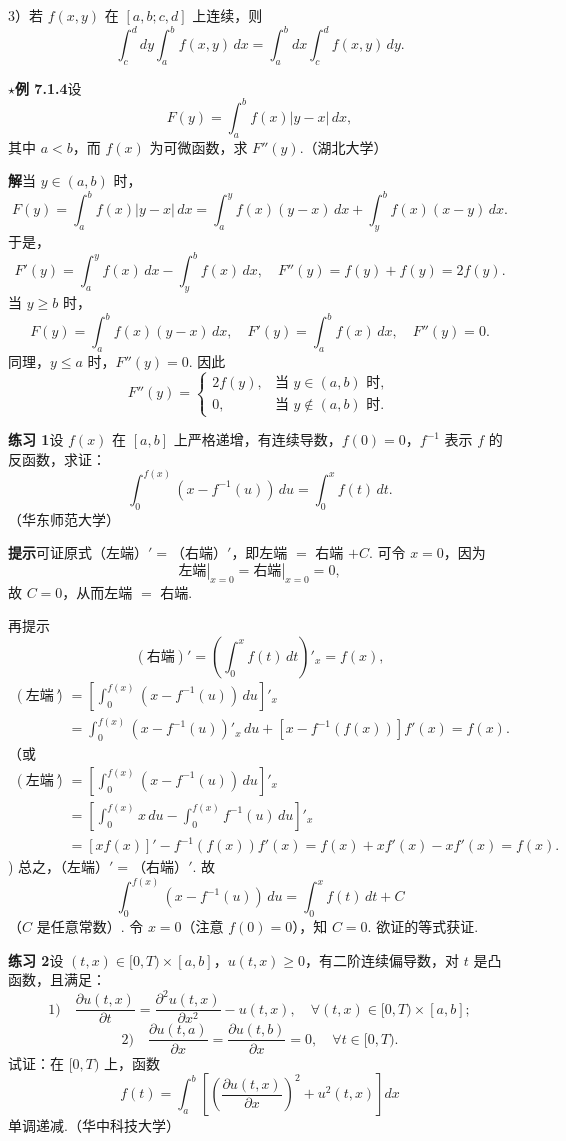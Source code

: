 \documentclass[UTF8, 12pt, fontset=fandol, oneside]{ctexart}
\begin{document}
3）若 $f(x,y)$ 在 $[a,b;c,d]$ 上连续，则
\[
\int_c^d dy\int_a^b f(x,y)\,dx
=\int_a^b dx\int_c^d f(x,y)\,dy.
\]

\noindent\textbf{$\star$例 7.1.4}\quad 设
\[
F(y)=\int_a^b f(x)|y-x|\,dx,
\]
其中 $a<b$，而 $f(x)$ 为可微函数，求 $F''(y)$.（湖北大学）

\noindent\textbf{解}\quad 当 $y\in(a,b)$ 时，
\[
F(y)=\int_a^b f(x)|y-x|\,dx
=\int_a^y f(x)(y-x)\,dx+\int_y^b f(x)(x-y)\,dx.
\]
于是，
\[
F'(y)=\int_a^y f(x)\,dx-\int_y^b f(x)\,dx,\quad
F''(y)=f(y)+f(y)=2f(y).
\]
当 $y\ge b$ 时，
\[
F(y)=\int_a^b f(x)(y-x)\,dx,\quad
F'(y)=\int_a^b f(x)\,dx,\quad F''(y)=0.
\]
同理，$y\le a$ 时，$F''(y)=0$. 因此
\[
F''(y)=
\begin{cases}
2f(y), & \text{当 }y\in(a,b)\text{ 时},\\
0, & \text{当 }y\notin(a,b)\text{ 时}.
\end{cases}
\]

\noindent\textbf{练习 1}\quad 设 $f(x)$ 在 $[a,b]$ 上严格递增，有连续导数，$f(0)=0$，$f^{-1}$ 表示 $f$ 的反函数，求证：
\[
\int_0^{f(x)}\left(x-f^{-1}(u)\right)\,du=\int_0^x f(t)\,dt.
\]
（华东师范大学）

\noindent\textbf{提示}\quad 可证原式（左端）$'=$（右端）$'$，即左端 $=$ 右端 $+C$. 可令 $x=0$，因为
\[
\left.\text{左端}\right|_{x=0}=\left.\text{右端}\right|_{x=0}=0,
\]
故 $C=0$，从而左端 $=$ 右端.

再提示
\[
\left(\text{右端}\right)'=\left(\int_0^x f(t)\,dt\right)'_x=f(x),
\]
\[
\begin{aligned}
\left(\text{左端}\right)'
&=\left[\int_0^{f(x)}\left(x-f^{-1}(u)\right)\,du\right]'_x\\
&=\int_0^{f(x)}\left(x-f^{-1}(u)\right)'_x\,du
+\left[x-f^{-1}(f(x))\right]f'(x)=f(x).
\end{aligned}
\]
（或
\[
\begin{aligned}
\left(\text{左端}\right)'
&=\left[\int_0^{f(x)}\left(x-f^{-1}(u)\right)\,du\right]'_x\\
&=\left[\int_0^{f(x)}x\,du-\int_0^{f(x)}f^{-1}(u)\,du\right]'_x\\
&=\left[xf(x)\right]'-f^{-1}(f(x))f'(x)
=f(x)+xf'(x)-xf'(x)=f(x).
\end{aligned}
\])
总之，（左端）$'=$（右端）$'$. 故
\[
\int_0^{f(x)}\left(x-f^{-1}(u)\right)\,du
=\int_0^x f(t)\,dt+C
\]
（$C$ 是任意常数）. 令 $x=0$（注意 $f(0)=0$），知 $C=0$. 欲证的等式获证.

\noindent\textbf{练习 2}\quad 设 $(t,x)\in[0,T)\times[a,b]$，$u(t,x)\ge0$，有二阶连续偏导数，对 $t$ 是凸函数，且满足：
\[
1)\quad \frac{\partial u(t,x)}{\partial t}
=\frac{\partial^2 u(t,x)}{\partial x^2}-u(t,x),
\quad \forall(t,x)\in[0,T)\times[a,b];
\]
\[
2)\quad
\frac{\partial u(t,a)}{\partial x}
=\frac{\partial u(t,b)}{\partial x}=0,\quad \forall t\in[0,T).
\]
试证：在 $[0,T)$ 上，函数
\[
f(t)=\int_a^b\left[\left(\frac{\partial u(t,x)}{\partial x}\right)^2+u^2(t,x)\right]dx
\]
单调递减.（华中科技大学）
\end{document}
